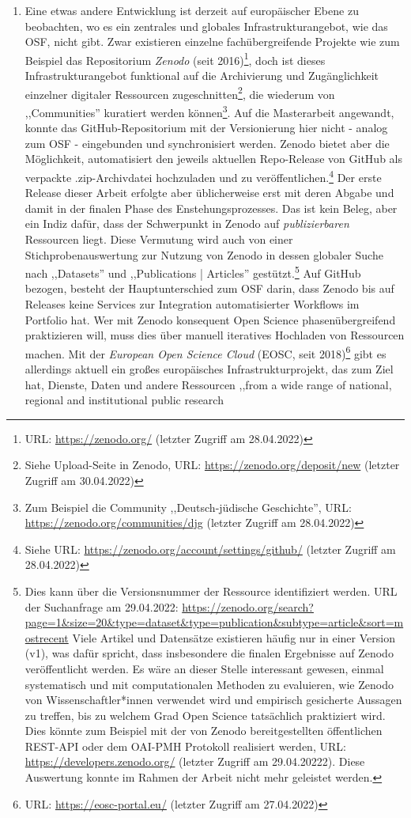 \begin{enumerate}
\item Eine etwas andere Entwicklung ist derzeit auf europäischer Ebene zu beobachten, wo es ein zentrales und globales Infrastrukturangebot, wie das OSF, nicht gibt. Zwar existieren einzelne fachübergreifende Projekte wie zum Beispiel das Repositorium \textit{Zenodo} (seit 2016)\footnote{URL: \url{https://zenodo.org/} (letzter Zugriff am 28.04.2022)}, doch ist dieses Infrastrukturangebot funktional auf die Archivierung und Zugänglichkeit einzelner digitaler Ressourcen zugeschnitten\footnote{Siehe Upload-Seite in Zenodo, URL: \url{https://zenodo.org/deposit/new} (letzter Zugriff am 30.04.2022)}, die wiederum von ,,Communities'' kuratiert werden können\footnote{Zum Beispiel die Community ,,Deutsch-jüdische Geschichte'', URL: \url{https://zenodo.org/communities/djg} (letzter Zugriff am 28.04.2022)}. Auf die Masterarbeit angewandt, konnte das GitHub-Repositorium mit der Versionierung hier nicht - analog zum OSF - eingebunden und synchronisiert werden. Zenodo bietet aber die Möglichkeit, automatisiert den jeweils aktuellen Repo-Release von GitHub als verpackte .zip-Archivdatei hochzuladen und zu veröffentlichen.\footnote{Siehe URL: \url{https://zenodo.org/account/settings/github/} (letzter Zugriff am 28.04.2022)} Der erste Release dieser Arbeit erfolgte aber üblicherweise erst mit deren Abgabe und damit in der finalen Phase des Enstehungsprozesses. Das ist kein Beleg, aber ein Indiz dafür, dass der Schwerpunkt in Zenodo auf \textit{publizierbaren} Ressourcen liegt. Diese Vermutung wird auch von einer Stichprobenauswertung zur Nutzung von Zenodo in dessen globaler Suche nach ,,Datasets'' und ,,Publications | Articles'' gestützt.\footnote{Dies kann über die Versionsnummer der Ressource identifiziert werden. URL der Suchanfrage am 29.04.2022: \url{https://zenodo.org/search?page=1&size=20&type=dataset&type=publication&subtype=article&sort=mostrecent} Viele Artikel und Datensätze existieren häufig nur in einer Version (v1), was dafür spricht, dass insbesondere die finalen Ergebnisse auf Zenodo veröffentlicht werden. Es wäre an dieser Stelle interessant gewesen, einmal systematisch und mit computationalen Methoden zu evaluieren, wie Zenodo von Wissenschaftler*innen verwendet wird und empirisch gesicherte Aussagen zu treffen, bis zu welchem Grad Open Science tatsächlich praktiziert wird. Dies könnte zum Beispiel mit der von Zenodo bereitgestellten öffentlichen REST-API oder dem OAI-PMH Protokoll realisiert werden, URL: \url{https://developers.zenodo.org/} (letzter Zugriff am 29.04.20222). Diese Auswertung konnte im Rahmen der Arbeit nicht mehr geleistet werden.} Auf GitHub bezogen, besteht der Hauptunterschied zum OSF darin, dass Zenodo bis auf Releases keine Services zur Integration automatisierter Workflows im Portfolio hat. Wer mit Zenodo konsequent Open Science phasenübergreifend praktizieren will, muss dies über manuell iteratives Hochladen von Ressourcen machen. Mit der \textit{European Open Science Cloud} (EOSC, seit 2018)\footnote{URL: \url{https://eosc-portal.eu/} (letzter Zugriff am 27.04.2022)} gibt es allerdings aktuell ein großes europäisches Infrastrukturprojekt, das zum Ziel hat, Dienste, Daten und andere Ressourcen ,,from a wide range of national, regional and institutional public research 
\end{enumerate}

